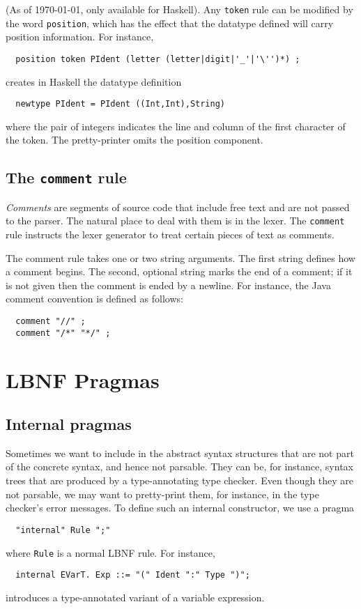 \documentclass[10pt]{article}
\begin{document}
\label{reg}\label{postoken}

(As of \today, only available for Haskell).
Any {\tt token} rule can be modified by the word
{\tt position}, which has the effect that the
datatype defined will carry position information.
For instance,
\begin{verbatim}
  position token PIdent (letter (letter|digit|'_'|'\'')*) ;
\end{verbatim}
creates in Haskell the datatype definition
\begin{verbatim}
  newtype PIdent = PIdent ((Int,Int),String)
\end{verbatim}
where the pair of integers indicates the line and column of
the first character of the token. The pretty-printer omits
the position component.




\subsection{The {\tt comment} rule}

\textit{Comments} are segments of source code that include free
text and are not passed to the parser. The natural place
to deal with them is in the lexer. The {\tt comment} rule instructs the
lexer generator to treat certain pieces of text as comments.

The comment rule takes one or two string arguments. The first
string defines how a comment begins.
The second, optional string marks the end of a comment;
if it is not given then the comment is ended by a newline.
For instance, the Java comment convention is defined as follows:
\begin{verbatim}
  comment "//" ;
  comment "/*" "*/" ;
\end{verbatim}


\section{LBNF Pragmas}
\label{pragmas}

\subsection{Internal pragmas}

Sometimes we want to include in the abstract syntax
structures that are not part of the concrete syntax,
and hence not parsable.
They can be, for instance, syntax trees that are produced by a
type-annotating type checker.
Even though they are not parsable, we may want to
pretty-print them, for instance, in the type checker's
error messages.
To define such an internal constructor, we use a pragma
\begin{verbatim}
  "internal" Rule ";"
\end{verbatim}
where {\tt Rule} is a normal LBNF rule. For instance,
\begin{verbatim}
  internal EVarT. Exp ::= "(" Ident ":" Type ")";
\end{verbatim}
introduces a type-annotated variant of a variable expression.
\end{document}
